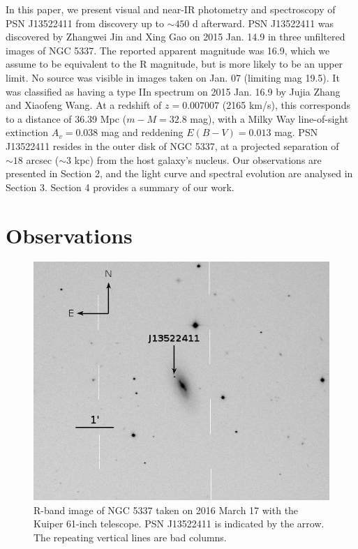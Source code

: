 \documentclass[iop]{emulateapj}
\begin{document}
In this paper, we present visual and near-IR photometry and spectroscopy of PSN J13522411 from discovery up to $\sim450$ d afterward. PSN J13522411 was discovered by Zhangwei Jin and Xing Gao on 2015 Jan. 14.9 in three unfiltered images of NGC 5337. The reported apparent magnitude was 16.9, which we assume to be equivalent to the R magnitude, but is more likely to be an upper limit. No source was visible in images taken on Jan. 07 (limiting mag 19.5). It was classified as having a type IIn spectrum on 2015 Jan. 16.9 by Jujia Zhang and Xiaofeng Wang. At a redshift of $z = 0.007007$ (2165 km/s), this corresponds to a distance of 36.39 Mpc ($m - M = 32.8$ mag), with a Milky Way line-of-sight extinction $A_v = 0.038$ mag and reddening $E(B - V) = 0.013$ mag. PSN J13522411 resides in the outer disk of NGC 5337, at a projected separation of $\sim18$ arcsec ($\sim3$ kpc) from the host galaxy's nucleus. Our observations are presented in Section 2, and the light curve and spectral evolution are analysed in Section 3. Section 4 provides a summary of our work.

\section{Observations} \label{obs}

\begin{figure}
  \includegraphics[width=\linewidth]{graphics/Kuiper_R.jpeg}
  \caption{R-band image of NGC 5337 taken on 2016 March 17 with the Kuiper 61-inch telescope. PSN J13522411 is indicated by the arrow. The repeating vertical lines are bad columns.}
  \label{fig:kuiper}
\end{figure}
\end{document}
